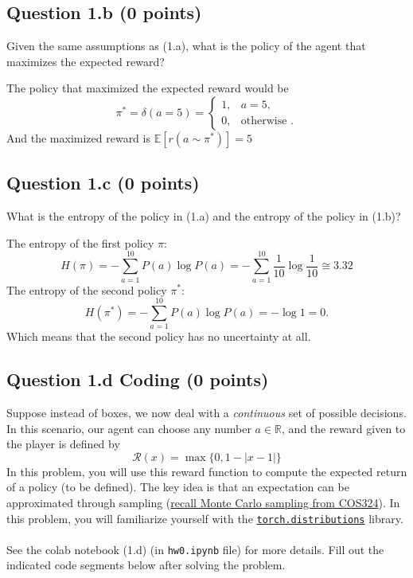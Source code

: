 \documentclass[12pt]{article}
\begin{document}
\subsection*{Question 1.b (0 points)}
Given the same assumptions as (1.a), what is the policy of the agent that maximizes the expected reward?
\begin{solution}
The policy that maximized the expected reward would be 
\begin{equation}
    \pi^* = \delta(a=5) = \begin{cases}
1, & a = 5, \\
0, & \text{otherwise }.
\end{cases}
\end{equation}
And the maximized reward is $\mathbb{E}[r(a\sim \pi^*)] = 5$

\end{solution}

\subsection*{Question 1.c (0 points)}
What is the entropy of the policy in (1.a) and the entropy of the policy in (1.b)? 

\begin{solution}
The entropy of the first policy $\pi$:
\begin{equation}
    H(\pi) = -\sum_{a=1}^{10}P(a)\log P(a) = -\sum_{a=1}^{10}\frac{1}{10}\log \frac{1}{10} \cong 3.32
\end{equation}
The entropy of the second policy $\pi^*$:
\begin{equation}
    H(\pi^*) = -\sum_{a=1}^{10}P(a)\log P(a) = -\log 1 = 0 .
\end{equation}
Which means that the second policy has no uncertainty at all.
\end{solution}

\subsection*{Question 1.d \textbf{Coding} (0 points)}
Suppose instead of boxes, we now deal with a \textit{continuous} set of possible decisions. In this scenario, our agent can choose any number $a \in \mathbb{R}$, and the reward given to the player is defined by
$$
    \mathcal{R}(x) = \max \biggr \{ 0, 1 - |x - 1| \biggr\}
$$
In this problem, you will use this reward function to compute the expected return of a policy (to be 
defined). The key idea is that an expectation can be approximated through sampling (\href{https://princeton-introml.github.io/files/ch15.pdf}{recall Monte Carlo sampling from COS324}). In this problem, you will familiarize yourself with the \href{https://pytorch.org/docs/stable/distributions.html}{\texttt{torch.distributions}} library.
\\\\
See the colab notebook (1.d) (in \texttt{hw0.ipynb} file) for more details. Fill 
out the indicated code segments below after solving 
the problem.
\end{document}
